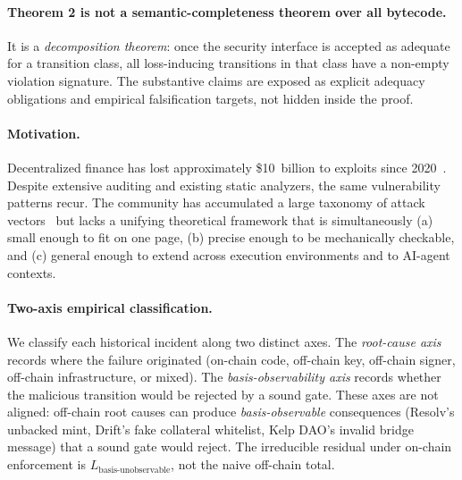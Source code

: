\documentclass[11pt,a4paper]{article}
\begin{document}
\paragraph{Theorem 2 is not a semantic-completeness theorem over all bytecode.} It is a \emph{decomposition theorem}: once the security interface is accepted as adequate for a transition class, all loss-inducing transitions in that class have a non-empty violation signature. The substantive claims are exposed as explicit adequacy obligations and empirical falsification targets, not hidden inside the proof.

\paragraph{Motivation.} Decentralized finance has lost approximately \$10~billion to exploits since 2020~\cite{rekt,defillama}. Despite extensive auditing and existing static analyzers, the same vulnerability patterns recur. The community has accumulated a large taxonomy of attack vectors~\cite{owasp,halborn-top100} but lacks a unifying theoretical framework that is simultaneously (a) small enough to fit on one page, (b) precise enough to be mechanically checkable, and (c) general enough to extend across execution environments and to AI-agent contexts.

\paragraph{Two-axis empirical classification.} We classify each historical incident along two distinct axes. The \emph{root-cause axis} records where the failure originated (on-chain code, off-chain key, off-chain signer, off-chain infrastructure, or mixed). The \emph{basis-observability axis} records whether the malicious transition would be rejected by a sound gate. These axes are not aligned: off-chain root causes can produce \emph{basis-observable} consequences (Resolv's unbacked mint, Drift's fake collateral whitelist, Kelp DAO's invalid bridge message) that a sound gate would reject. The irreducible residual under on-chain enforcement is $L_{\mathrm{basis\text{-}unobservable}}$, not the naive off-chain total.
\end{document}

